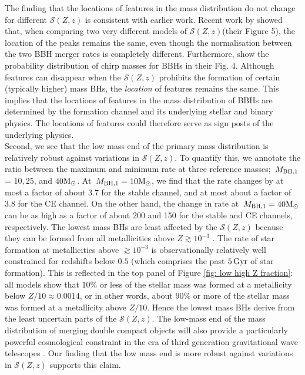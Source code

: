 \documentclass[linenumbers,twocolumn]{aastex631}
\newcommand{\Msun}{\ensuremath{\rm{M}_{\odot}}\xspace}
\newcommand{\Gyr}{\ensuremath{\,\rm{Gyr}}\xspace}
\newcommand{\Mbheen}{\ensuremath{\,M_{\rm BH, 1}}\xspace}
\newcommand{\SFRDzZ}{\ensuremath{\mathcal{S}(Z,z)}\xspace}
\begin{document}
The finding that the locations of features in the mass distribution do not change for different \SFRDzZ is consistent with earlier work. 
%
Recent work by \cite{chruslinska2022_review} showed that, when comparing two very different models of \SFRDzZ (their Figure 5), the location of the peaks remains the same, even though the normalisation between the two BBH merger rates is completely different. 
%
Furthermore, \cite{Broekgaarden+2021b} show the probability distribution of chirp masses for BBHs in their Fig. 4. Although features can disappear when the \SFRDzZ prohibits the formation of certain (typically higher) mass BHs, the \textit{location} of features remains the same.
%
This implies that the locations of features in the mass distribution of BBHs are determined by the formation channel and its underlying stellar and binary physics. The locations of features could therefore serve as sign posts of the underlying physics. \\



Second, we see that the low mass end of the primary mass distribution is relatively robust against variations in \SFRDzZ. 
To quantify this, we annotate the ratio between the maximum and minimum rate at three reference masses; \Mbheen = $10, 25$, and $40\Msun$.
At $\Mbheen=10\Msun$, we find that the rate changes by at most a factor of about 3.7 for the stable channel, and at most about a factor of 3.8 for the CE channel. 
On the other hand, the change in rate at $\Mbheen=40\Msun$ can be as high as a factor of about 200 and 150 for the stable and CE channels, respectively. 
%
The lowest mass BHs are least affected by the \SFRDzZ because they can be formed from all metallicities above $Z\gtrsim10^{-3}$ \citep[see e.g., Figures 7 and 13 from ][]{vanson+2022}.
The rate of star formation at metallicities above $\gtrsim 10^{-3}$ is observationally relatively well constrained for redshifts below $0.5$ (which comprises the past $5\Gyr$ of star formation). 
This is reflected in the top panel of Figure \ref{fig: low high Z fraction}: all models show that $10\%$ or less of the stellar mass was formed at a metallicity below $Z/10 \approx 0.0014$, or in other words, about $90\%$ or more of the stellar mass was formed at a metallicity above $Z/10$. Hence the lowest mass BHs derive from the least uncertain parts of the \SFRDzZ.
%
The low-mass end of the mass distribution of merging double compact objects will also provide a particularly powerful cosmological constraint in the era of third generation gravitational wave telescopes \citep{MariaEzquiaga2022}. Our finding that the low mass end is more robust against variations in \SFRDzZ supports this claim. 
\end{document}
